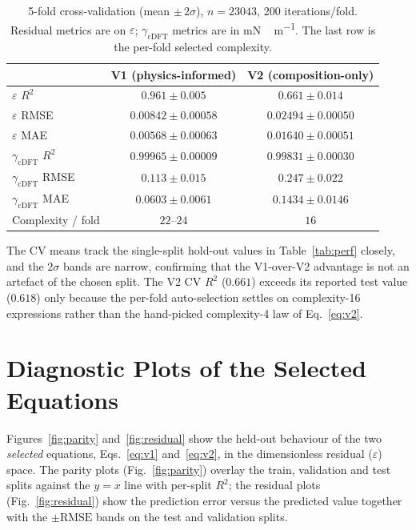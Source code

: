 \documentclass[11pt]{article}
\newcommand{\eps}{\varepsilon}
\newcommand{\gcDFT}{\gamma_{\mathrm{cDFT}}}
\begin{document}
\begin{table}[h]
\centering
\caption{5-fold cross-validation (mean $\pm\,2\sigma$), $n=\num{23043}$,
200 iterations/fold. Residual metrics are on $\eps$; $\gcDFT$ metrics are in
\si{mN\,m^{-1}}. The last row is the per-fold selected complexity.}
\label{tab:cv}
\small
\renewcommand{\arraystretch}{1.25}
\begin{tabular}{l c c}
\toprule
 & \textbf{V1} (physics-informed) & \textbf{V2} (composition-only) \\
\midrule
$\eps$ $R^2$       & $0.961 \pm 0.005$       & $0.661 \pm 0.014$ \\
$\eps$ RMSE        & $0.00842 \pm 0.00058$   & $0.02494 \pm 0.00050$ \\
$\eps$ MAE         & $0.00568 \pm 0.00063$   & $0.01640 \pm 0.00051$ \\
$\gcDFT$ $R^2$     & $0.99965 \pm 0.00009$   & $0.99831 \pm 0.00030$ \\
$\gcDFT$ RMSE      & $0.113 \pm 0.015$       & $0.247 \pm 0.022$ \\
$\gcDFT$ MAE       & $0.0603 \pm 0.0061$     & $0.1434 \pm 0.0146$ \\
\midrule
Complexity / fold  & $22$--$24$              & $16$ \\
\bottomrule
\end{tabular}
\end{table}

The CV means track the single-split hold-out values in Table~\ref{tab:perf}
closely, and the $2\sigma$ bands are narrow, confirming that the V1-over-V2
advantage is not an artefact of the chosen split. The V2 CV $R^2$ ($0.661$)
exceeds its reported test value ($0.618$) only because the per-fold
auto-selection settles on complexity-16 expressions rather than the
hand-picked complexity-4 law of Eq.~\eqref{eq:v2}.

\section{Diagnostic Plots of the Selected Equations}

Figures~\ref{fig:parity} and~\ref{fig:residual} show the held-out behaviour
of the two \emph{selected} equations, Eqs.~\eqref{eq:v1} and~\eqref{eq:v2},
in the dimensionless residual ($\eps$) space. The parity plots
(Fig.~\ref{fig:parity}) overlay the train, validation and test splits against
the $y=x$ line with per-split $R^2$; the residual plots
(Fig.~\ref{fig:residual}) show the prediction error versus the predicted
value together with the $\pm\mathrm{RMSE}$ bands on the test and validation
splits.
\end{document}
